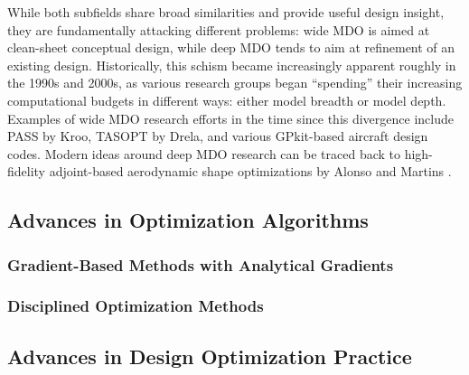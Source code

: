 \documentclass[12pt,vi,oneside]{report}
\begin{document}
    While both subfields share broad similarities and provide useful design insight, they are fundamentally attacking different problems: wide MDO is aimed at clean-sheet conceptual design, while deep MDO tends to aim at refinement of an existing design. Historically, this schism became increasingly apparent roughly in the 1990s and 2000s, as various research groups began ``spending'' their increasing computational budgets in different ways: either model breadth or model depth. Examples of wide MDO research efforts in the time since this divergence include PASS \cite{antoine_framework_2005} by Kroo, TASOPT \cite{drela_tasopt_2010} by Drela, and various GPkit-based \cite{hoburg_geometric_2014} aircraft design codes. Modern ideas around deep MDO research can be traced back to high-fidelity adjoint-based aerodynamic shape optimizations by Alonso and Martins \cite{alonso_pymdo_2004, martins_coupledadjoint_2005}.

    \subsection{Advances in Optimization Algorithms}

    \subsubsection{Gradient-Based Methods with Analytical Gradients}



    \subsubsection{Disciplined Optimization Methods}

    \subsection{Advances in Design Optimization Practice}


\end{document}
